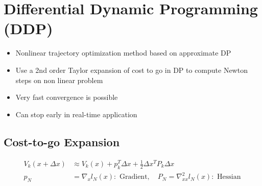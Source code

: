 \documentclass[11pt]{article}
\begin{document}
\section{Differential Dynamic Programming (DDP)}
\begin{itemize}
    \item Nonlinear trajectory optimization method based on approximate DP
    \item Use a 2nd order Taylor expansion of cost to go in DP to compute Newton steps on non linear problem
    \item Very fast convergence is possible
    \item Can stop early in real-time application
\end{itemize}
\subsection{Cost-to-go Expansion}
\begin{align*}
    V_k(x+\Delta x) &\approx V_k(x) + p_k^T\Delta x + \frac{1}{2}\Delta x^TP_k\Delta x
    \\
    p_N &= \nabla_x l_N(x): \text{ Gradient}, \quad P_N = \nabla_{xx}^2l_N(x): \text{ Hessian}
\end{align*}
\end{document}

